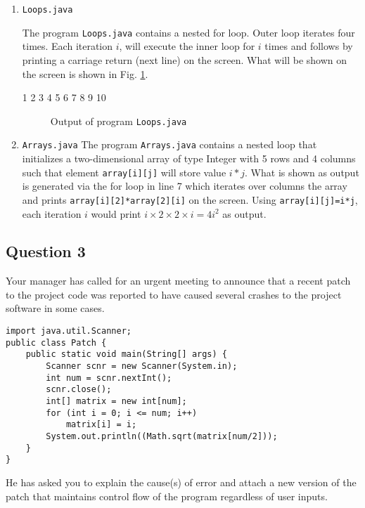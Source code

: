 \begin{enumerate}[label=(\alph*)]
\item \texttt{Loops.java}

The program \texttt{Loops.java} contains a nested for loop. Outer loop iterates four times. Each iteration $i$, will execute the inner loop for $i$ times and follows by printing a carriage return (next line) on the screen. What will be shown on the screen is shown in Fig. \ref{fig1}.

\begin{verbbox}
1
2 3
4 5 6
7 8 9 10
\end{verbbox}
\begin{figure}[H]\centering
\theverbbox
\caption{Output of program \texttt{Loops.java}} \label{fig1}
\end{figure}

\item \texttt{Arrays.java}
The program \texttt{Arrays.java} contains a nested loop that initializes a two-dimensional array of type Integer with 5 rows and 4 columns such that element \texttt{array[i][j]} will store value $i*j$. What is shown as output is generated via the for loop in line 7 which iterates over columns the array and prints \texttt{array[i][2]*array[2][i]} on the screen. Using \texttt{array[i][j]=i*j}, each iteration $i$ would print $i\times 2\times 2\times i = 4 i^2$ as output.

\end{enumerate}

\newpage
\subsection*{Question 3}
Your manager has called for an urgent meeting to announce that a recent patch to the project code was reported to have caused several crashes to the project software in some cases.

\lstset{language=java, tabsize=2}
\begin{lstlisting}
import java.util.Scanner;
public class Patch {
	public static void main(String[] args) {
		Scanner scnr = new Scanner(System.in);
		int num = scnr.nextInt();
		scnr.close();
		int[] matrix = new int[num];
		for (int i = 0; i <= num; i++)
			matrix[i] = i;
		System.out.println((Math.sqrt(matrix[num/2]));
	}
}
\end{lstlisting}

He has asked you to explain the cause(s) of error and attach a new version of the patch that maintains control flow of the program regardless of user inputs.

